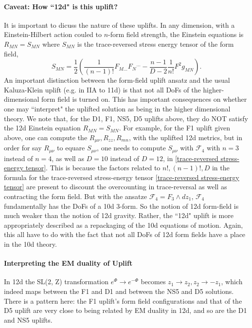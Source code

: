\paragraph{Caveat: How ``12d" is this uplift?}
It is important to dicuss the nature of these uplifts.
In any dimension, with a Einstein-Hilbert action couled to $n$-form field strength, the Einstein equations is $R_{MN} = S_{MN}$ where $S_{MN}$ is the trace-reversed stress energy tensor of the form field,
\begin{equation}
S_{MN} = \frac{1}{2}\left(\frac{1}{(n-1)!}F_{M...}F_{N}{}^{...} - \frac{n-1}{D-2}\frac{1}{n!}F^2g_{MN}\right).
\label{trace-reversed stress-energy tensor}
\end{equation}
An important distinction between the form-field uplift ansatz and the usual Kaluza-Klein uplift (e.g. in IIA to 11d) is that not all DoFs of the higher-dimensional form field is turned on.
This has important consequences on whether one may ``interpret" the uplifted solution as being in the higher dimensional theory.
We note that, for the D1, F1, NS5, D5 uplifts above, they do NOT satisfy the 12d Einstein equation $R_{MN} = S_{MN}$.
For example, for the F1 uplift given above, one can compute the $R_{\mu\nu}, R_{zz}, R_{mn}$, with the uplifted 12d metrics, but in order for say $R_{\mu\nu}$ to equare $S_{\mu\nu}$, one needs to compute $S_{\mu\nu}$ with $\mathcal{F}_4$ with $n=3$ instead of $n=4$, as well as $D=10$ instead of $D=12$, in \eqref{trace-reversed stress-energy tensor}.
This is because the factors related to $n!, (n-1)!, D$ in the formula for the trace-reversed stress-energy tensor \eqref{trace-reversed stress-energy tensor} are present to discount the overcounting in trace-reversal as well as contracting the form field. But with the ansatze $\mathcal{F}_4 = F_3 \wedge dz_1$, $\mathcal{F}_4$ fundamentally has the DoFs of a 10d 3-form.
So the notion of 12d form-field is much weaker than the notion of 12d gravity.
Rather, the ``12d" uplift is more appropriately described as a repackaging of the 10d equations of motion.
Again, this all have to do with the fact that not all DoFs of 12d form fields have a place in the 10d theory.

\paragraph{Interpreting the EM duality of Uplift}

In 12d the SL(2, Z) transformation $e^\Phi \to e^{-\Phi}$ becomes $z_1 \to z_2, z_2 \to -z_1$, which indeed maps between the F1 and D1 and between the NS5 and D5 solutions.
There is a pattern here: the F1 uplift's form field configurations and that of the D5 uplift are very close to being related by EM duality in 12d, and so are the D1 and NS5 uplifts.

